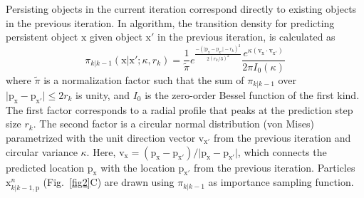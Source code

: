 Persisting objects in the current iteration correspond directly to existing objects in the previous iteration. In algorithm, the transition density for predicting persistent object $\mathrm{x}$ given object $\mathrm{x'}$ in the previous iteration, is calculated as
\begin{equation}
\label{eq:persist-prediction}
\pi_{k|k-1}(\mathrm{x}|\mathrm{x'}; \kappa, r_k) = \frac{1}{\tilde{\pi}} e^{\frac{-(\vert \mathrm{p}_{\mathrm{x}} - \mathrm{p}_{\mathrm{x'}}  \vert - r_k)^2  }{2 (r_k/3)^2}} \frac{e^{\kappa (\mathrm{v}_{\mathrm{x}} \cdot \mathrm{v}_{\mathrm{x'}})}}{2 \pi I_0(\kappa)}
\end{equation}
where $\tilde{\pi}$ is a normalization factor such that the sum of $\pi_{k|k-1}$ over $\vert \mathrm{p}_{\mathrm{x}} - \mathrm{p}_{\mathrm{x'}} \vert \leq 2r_k$ is unity, and $I_0$ is the zero-order Bessel function of the first kind. The first factor corresponds to a radial profile that peaks at the prediction step size $r_k$. The second factor is a circular normal distribution (von Mises) parametrized with the unit direction vector $\mathrm{v}_{\mathrm{x'}}$ from the previous iteration and circular variance $\kappa$. Here, $\mathrm{v}_{\mathrm{x}} = (\mathrm{p}_{\mathrm{x}} - \mathrm{p}_{\mathrm{x'}})/\vert \mathrm{p}_{\mathrm{x}} - \mathrm{p}_{\mathrm{x'}} \vert$, which connects the predicted location $\mathrm{p}_{\mathrm{x}}$ with the location $\mathrm{p}_{\mathrm{x'}}$ from the previous iteration. Particles $\mathrm{x}_{k|k-1,\mathrm{p}}^{n}$ (Fig.~\ref{fig2}C) are drawn using $\pi_{k|k-1}$ as importance sampling function.

